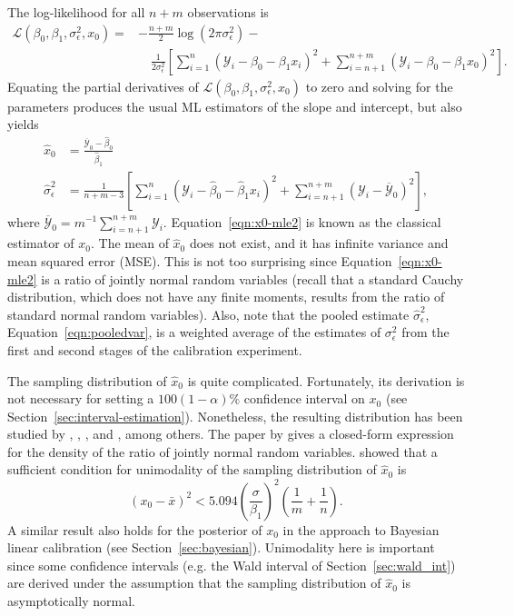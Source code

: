\documentclass[cmfont,usenames,dvipsnames,leqno]{afit-etd}\usepackage[]{graphicx}\usepackage[]{color}
\newcommand{\loglik}{\mathscr{L}}
\newcommand{\mc}[1]{\ensuremath{\mathcal{#1}}}
\newcommand{\wh}[1]{\ensuremath{\widehat{#1}}}
\newcommand{\wb}[1]{\ensuremath{\overline{#1}}}
\begin{document}
The log-likelihood for all $n + m$ observations is
\begin{equation*}
\begin{split}
  \loglik\left(\beta_0, \beta_1, \sigma_\epsilon^2, x_0\right) = &-\frac{n+m}{2}\log(2\pi\sigma_\epsilon^2)-\\ &\quad \frac{1}{2\sigma_\epsilon^2}\left[\sum_{i=1}^n(\mc{Y}_i-\beta_0-\beta_1x_i)^2 + \sum_{i=n+1}^{n+m}(\mc{Y}_i-\beta_0-\beta_1x_0)^2\right].
\end{split}
\end{equation*}
Equating the partial derivatives of $\loglik\left(\beta_0, \beta_1, \sigma_\epsilon^2, x_0\right)$ to zero and solving for the parameters produces the usual \ac{ML} estimators of the slope and intercept, but also yields
\begin{align}
  \wh{x}_0 &= \frac{\wb{\mc{Y}}_0-\wh{\beta}_0}{\wh{\beta}_1} \label{eqn:x0-mle2} \\
  \wh{\sigma}_\epsilon^2 &= \frac{1}{n+m-3}\left[\sum_{i=1}^n\left(\mc{Y}_i-\wh{\beta}_0-\wh{\beta}_1 x_i\right)^2 + \sum_{i=n+1}^{n+m}\left(\mc{Y}_i-\wb{\mc{Y}}_0\right)^2\right] \label{eqn:pooledvar},
\end{align}
where $\wb{\mc{Y}}_0 = m^{-1}\sum_{i=n+1}^{n+m}\mc{Y}_i$. Equation~\eqref{eqn:x0-mle2} is known as the classical estimator of $x_0$. The mean of $\wh{x}_0$ does not exist, and it has infinite variance and mean squared error (MSE). This is not too surprising since Equation~\eqref{eqn:x0-mle2} is a ratio of jointly normal random variables (recall that a standard Cauchy distribution, which does not have any finite moments, results from the ratio of standard normal random variables). Also, note that the pooled estimate $\wh{\sigma}_\epsilon^2$, Equation~\eqref{eqn:pooledvar}, is a weighted average of the estimates of $\sigma_\epsilon^2$ from the first and second stages of the calibration experiment. 

The sampling distribution of $\wh{x}_0$ is quite complicated. Fortunately, its derivation is not necessary for setting a $100(1-\alpha)\%$ confidence interval on $x_0$ (see Section~\ref{sec:interval-estimation}). Nonetheless, the resulting distribution has been studied by \citet{fieller_distribution_1932}, \citet{hinkley_ratio_1969}, \citet{buonaccorsi_design_1986}, and \citet{pham-gia_density_2006}, among others. The paper by \citet{pham-gia_density_2006} gives a closed-form expression for the density of the ratio of jointly normal random variables. \citet{buonaccorsi_design_1986} showed that a sufficient condition for unimodality of the sampling distribution of $\wh{x}_0$ is
\begin{equation*}
  (x_0 - \bar{x})^2 < 5.094 \left(\frac{\sigma}{\beta_1}\right)^2 \left( \frac{1}{m} + \frac{1}{n} \right).
\end{equation*}
A similar result also holds for the posterior of $x_0$ in the \citet{hunter_bayesian_1981} approach to Bayesian linear calibration (see Section~\ref{sec:bayesian}). Unimodality here is important since some confidence intervals (e.g. the Wald interval of Section~\ref{sec:wald_int}) are derived under the assumption that the sampling distribution of $\wh{x}_0$ is asymptotically normal. 
\end{document}
